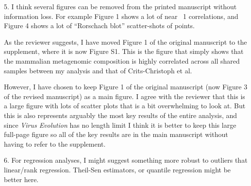 \documentclass[11pt, oneside]{article}   	%
\newcommand{\response}[1]{{\color{black}#1}}
\begin{document}
5. I think several figures can be removed from the printed manuscript without information loss. For example Figure 1 shows a lot of near ~1 correlations, and Figure 4 shows a lot of ``Rorschach blot'' scatter-shots of points.

\response{
As the reviewer suggests, I have moved Figure 1 of the original manuscript to the supplement, where it is now Figure S1.
This is the figure that simply shows that the mammalian metagenomic composition is highly correlated across all shared samples between my analysis and that of Crits-Christoph et al.

However, I have chosen to keep Figure 1 of the original manuscript (now Figure 3 of the revised manuscript) as a main figure.
I agree with the reviewer that this is a large figure with lots of scatter plots that is a bit overwhelming to look at.
But this is also represents arguably the most key results of the entire analysis, and since \textit{Virus Evolution} has no length limit I think it is better to keep this large full-page figure so all of the key results are in the main manuscript without having to refer to the supplement.
}

6. For regression analyses, I might suggest something more robust to outliers that linear/rank regression. Theil-Sen estimators, or quantile regression might be better here.
\end{document}

